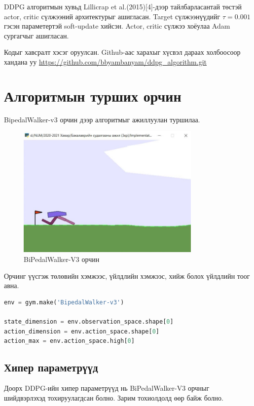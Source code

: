 \documentclass[12pt,A4]{report}
\begin{document}
DDPG алгоритмын хувьд Lillicrap et al.(2015)[4]-дээр тайлбарласантай төстэй actor, critic сүлжээний архитектурыг ашигласан. Target сүлжээнүүдийг $\tau=0.001$ гэсэн параметертэй soft-update хийсэн. Actor, critic сүлжээ хоёулаа Adam сургагчыг ашигласан.

Кодыг хавсралт хэсэг оруулсан. Github-аас харахыг хүсвэл дараах холбоосоор хандана уу \url{https://github.com/bbyambanyam/ddpg_algorithm.git}

\section{Алгоритмын турших орчин}

BipedalWalker-v3 орчин дээр алгоритмыг ажиллуулан туршилаа.

\begin{figure}[H]
\centering
\includegraphics[width=0.8\textwidth]{./images/bipedalwalker}
\caption{BiPedalWalker-V3 орчин}
\end{figure}

Орчинг үүсгэж төлөвийн хэмжээс, үйлдлийн хэмжээс, хийж болох үйлдлийн тоог авна.

\begin{lstlisting}[language=Python, caption=Орчин үүсгэх, frame=single]
env = gym.make('BipedalWalker-v3')

state_dimension = env.observation_space.shape[0]
action_dimension = env.action_space.shape[0]
action_max = env.action_space.high[0]
\end{lstlisting}

\subsection{Хипер параметрүүд}

Доорх DDPG-ийн хипер параметрүүд нь BiPedalWalker-V3 орчныг шийдвэрлэхэд тохируулагдсан болно. Зарим тохиолдолд өөр байж болно.
\end{document}
